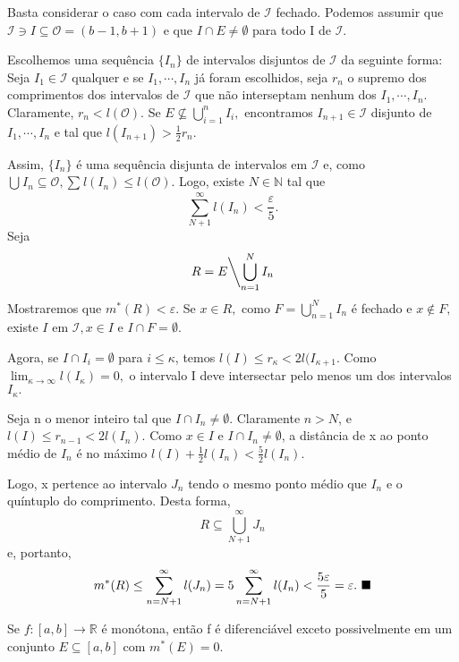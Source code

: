 \documentclass[analysis_notes.tex]{subfiles}
\begin{document}
\begin{proof*}
	Basta considerar o caso com cada intervalo de \(\mathcal{I}\) fechado. Podemos assumir que
	\(\mathcal{I}\ni I \subseteq{\mathcal{O}=(b-1, b+1)}\) e que \(I\cap E \neq\emptyset\) para todo I
	de \(\mathcal{I}\).

	Escolhemos uma sequência \(\{I_{n}\}\) de intervalos disjuntos de \(\mathcal{I}\) da
	seguinte forma: Seja \(I_{1}\in \mathcal{I}\) qualquer e se \(I_{1}, \cdots, I_{n}\) já foram
	escolhidos, seja \(r_{n}\) o supremo dos comprimentos dos intervalos de \(\mathcal{I}\) que não interseptam
	nenhum dos \(I_{1}, \cdots, I_{n}\). Claramente, \(r_{n} <  l(\mathcal{O}).\) Se
	\(E\not\subseteq{\bigcup_{i=1}^{n}{I_{i}}},\) encontramos \(I_{n+1}\in \mathcal{I}\)
	disjunto de \(I_{1}, \cdots, I_{n}\) e tal que \(l(I_{n+1}) > \frac{1}{2}r_{n}\).

	Assim, \(\{I_{n}\}\) é uma sequência disjunta de intervalos em \(\mathcal{I}\) e, como
	\(\bigcup_{}^{}{I_{n}\subseteq{\mathcal{O}}}, \sum\limits_{}^{}l(I_{n})\leq l(\mathcal{O}).\) Logo,
	existe \(N\in \mathbb{N}\) tal que
	\[
		\sum\limits_{N+1}^{\infty} l(I_{n}) < \frac{\varepsilon }{5}.
	\]
	Seja
	\[
		R = E\biggl\backslash\bigcup_{n=1}^{N}{I_{n}}\biggr.
	\]
	Mostraremos que \(m^{*}(R) < \varepsilon .\) Se \(x\in R,\) como \(F = \bigcup_{n=1}^{N}{I_{n}}\) é
	fechado e \(x\not\in F,\) existe \(I\) em \(\mathcal{I}, x\in I\) e \(I\cap F=\emptyset.\)

	Agora, se \(I\cap I_{i} = \emptyset\) para \(i\leq \kappa \), temos \(l(I)\leq r_{\kappa } < 2l(I_{\kappa +1}.\)
	Como \(\lim_{\kappa \to \infty}l(I_{\kappa }) = 0,\) o intervalo I deve intersectar
	pelo menos um dos intervalos \(I_{\kappa }.\)

	Seja n o menor inteiro tal que \(I\cap I_{n} \neq\emptyset\). Claramente \(n > N\), e
	\(l(I)\leq r_{n-1} < 2l(I_{n}).\) Como \(x\in I\) e \(I\cap I_{n} \neq\emptyset\), a distância de
	x ao ponto médio de \(I_{n}\) é no máximo \(l(I) + \frac{1}{2}l(I_{n}) < \frac{5}{2} l(I_{n}).\)

	Logo, x pertence ao intervalo \(J_{n}\) tendo o mesmo ponto médio que \(I_{n}\) e
	o quíntuplo do comprimento. Desta forma,
	\[
		R\subseteq{\bigcup_{N+1}^{\infty}{J_{n}}}
	\]
	e, portanto,
	\[
		m^{*}(R)\leq \sum\limits_{n=N+1}^{\infty}l(J_{n}) = 5\sum\limits_{n=N+1}^{\infty}l(I_{n}) < \frac{5\varepsilon }{5} = \varepsilon .\text{ $\blacksquare$}
	\]
\end{proof*}
\begin{lemma*}
	Se \(f:[a, b]\rightarrow \mathbb{R}\) é monótona, então f é diferenciável exceto
	possivelmente em um conjunto \(E\subseteq{[a, b]}\) com \(m^{*}(E) = 0\).
\end{lemma*}
\end{document}
